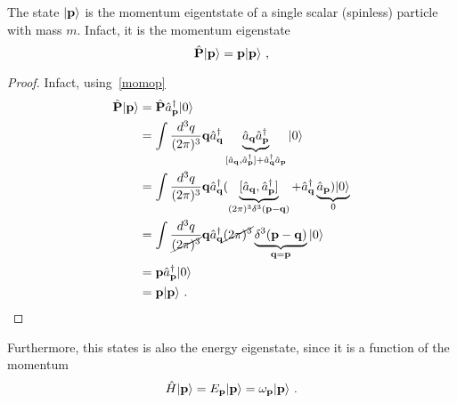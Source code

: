     The state $\vert\mathbf p\rangle$ is the momentum eigentstate of a single scalar (spinless) particle with mass $m$. Infact, it is the momentum eigenstate 
    \begin{equation*}
        \hat{\mathbf P} \vert\mathbf p\rangle = \mathbf p \vert\mathbf p\rangle ~,
    \end{equation*}
    \begin{proof}
        Infact, using~\eqref{momop}
        \begin{equation*}
        \begin{aligned}
            \hat{\mathbf P} \vert\mathbf p\rangle & = \hat{\mathbf P} \hat a_{\mathbf p}^\dagger \vert0\rangle \\ & = \int \frac{d^3 q}{(2\pi)^3} \mathbf q \hat a_{\mathbf q}^\dagger \underbrace{\hat a_{\mathbf q} \hat a_{\mathbf p}^\dagger}_{[\hat a_{\mathbf q}, \hat a_{\mathbf p}^\dagger] + \hat a_{\mathbf q}^\dagger \hat a_{\mathbf p}} \vert0\rangle \\ & = \int \frac{d^3 q}{(2\pi)^3} \mathbf q \hat a_{\mathbf q}^\dagger (\underbrace{[\hat a_{\mathbf q}, \hat a_{\mathbf p}^\dagger]}_{(2\pi)^3 \delta^3 (\mathbf p - \mathbf q)} + \hat a_{\mathbf q}^\dagger \underbrace{\hat a_{\mathbf p}) \vert0\rangle}_0 \\ & = \int \frac{d^3 q}{\cancel{(2\pi)^3}} \mathbf q \hat a_{\mathbf q}^\dagger  \cancel{(2\pi)^3} \underbrace{\delta^3 (\mathbf p - \mathbf q)}_{\mathbf q = \mathbf p} \vert0\rangle \\ & = \mathbf p \hat a_{\mathbf p}^\dagger \vert0\rangle \\ & = \mathbf p \vert\mathbf p\rangle  ~.
        \end{aligned}
        \end{equation*}
    \end{proof}
    Furthermore, this states is also the energy eigenstate, since it is a function of the momentum 
    \begin{equation*}
        \hat H \vert\mathbf p\rangle = E_{\mathbf p} \vert\mathbf p\rangle = \omega_{\mathbf p} \vert\mathbf p\rangle ~.
    \end{equation*}
